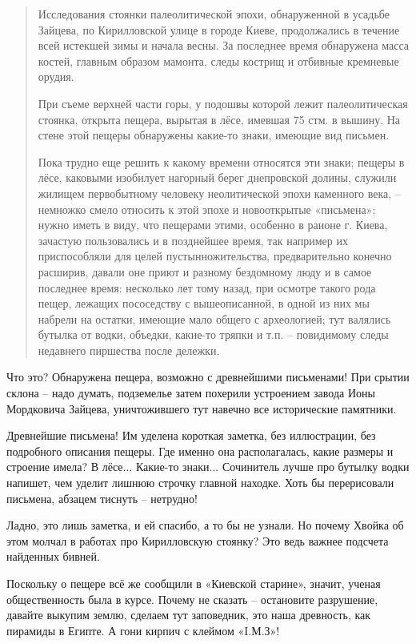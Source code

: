 \begin{quotation}
Исследования стоянки палеолитической эпохи, обнаруженной в усадьбе Зайцева, по Кирилловской улице в городе Киеве, продолжались в течение всей истекшей зимы и начала весны. За последнее время обнаружена масса костей, главным образом мамонта, следы кострищ и отбивные кремневые орудия.

При съеме верхней части горы, у подошвы которой лежит палеолитическая стоянка, открыта пещера, вырытая в лёсе, имевшая 75 стм. в вышину. На стене этой пещеры обнаружены какие-то знаки, имеющие вид письмен.

Пока трудно еще решить к какому времени относятся эти знаки; пещеры в лёсе, каковыми изобилует нагорный берег днепровской долины, служили жилищем первобытному человеку неолитической эпохи каменного века, – немножко смело относить к этой эпохе и новооткрытые «письмена»; нужно иметь в виду, что пещерами этими, особенно в раионе г. Киева, зачастую пользовались и в позднейшее время, так например их приспособляли для целей пустынножительства, предварительно конечно расширив, давали оне приют и разному бездомному люду и в самое последнее время: несколько лет тому назад, при осмотре такого рода пещер, лежащих пососедству с вышеописанной, в одной из них мы набрели на остатки, имеющие мало общего с археологией; тут валялись бутылка от водки, объедки, какие-то тряпки и т.п. – повидимому следы недавнего пиршества после дележки.
\end{quotation}

Что это? Обнаружена пещера, возможно с древнейшими письменами! При срытии склона – надо думать, подземелье затем похерили устроением завода Ионы Мордковича Зайцева, уничтожившего тут навечно все исторические памятники.

Древнейшие письмена! Им уделена короткая заметка, без иллюстрации, без подробного описания пещеры. Где именно она располагалась, какие размеры и строение имела? В лёсе... Какие-то знаки... Сочинитель лучше про бутылку водки напишет, чем уделит лишнюю строчку главной находке. Хоть бы перерисовали письмена, абзацем тиснуть – нетрудно!

Ладно, это лишь заметка, и ей спасибо, а то бы не узнали. Но почему Хвойка об этом молчал в работах про Кирилловскую стоянку? Это ведь важнее подсчета найденных бивней.

Поскольку о пещере всё же сообщили в «Киевской старине», значит, ученая общественность была в курсе. Почему не сказать – остановите разрушение, давайте выкупим землю, сделаем тут заповедник, это наша древность, как пирамиды в Египте. А гони кирпич с клеймом «I.М.З»! 

